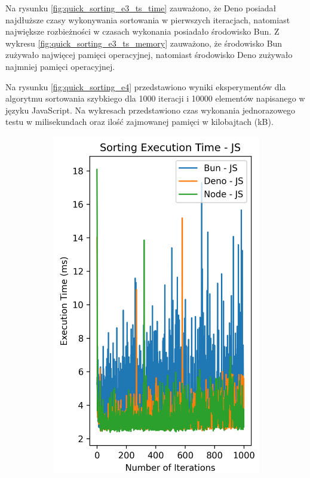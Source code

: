 Na rysunku \ref{fig:quick_sorting_e3_ts_time} zauważono, że Deno posiadał najdłuższe czasy wykonywania sortowania w pierwszych iteracjach, natomiast największe rozbieżności w czasach wykonania posiadało środowisko Bun. Z wykresu \ref{fig:quick_sorting_e3_ts_memory} zauważono, że środowisko Bun zużywało najwięcej pamięci operacyjnej, natomiast środowisko Deno zużywało najmniej pamięci operacyjnej.

Na rysunku \ref{fig:quick_sorting_e4} przedstawiono wyniki eksperymentów dla algorytmu sortowania szybkiego dla 1000 iteracji i 10000 elementów napisanego w języku JavaScript. Na wykresach przedstawiono czas wykonania jednorazowego testu w milisekundach oraz ilość zajmowanej pamięci w kilobajtach (kB).

\begin{figure}[H]
  \centering
  \begin{subfigure}[b]{0.42\textwidth}
    \centering
    \includegraphics[width=\textwidth]{Figures/sorting/sorting_quick_1000_10000_js_time.png}

\end{subfigure}
\end{figure}
